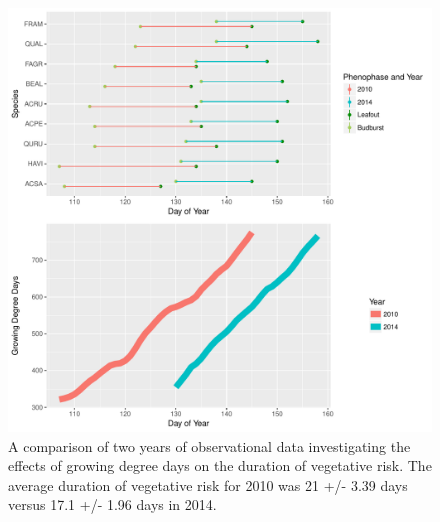 \documentclass{article}\usepackage[]{graphicx}\usepackage[]{color}
\begin{document}
\begin{figure} [H] 
\begin{center}
\includegraphics{..//figure/HF_gddTime.pdf}
\caption{A comparison of two years of observational data investigating the effects of growing degree days on the duration of vegetative risk. The average duration of vegetative risk for 2010 was 21 +/- 3.39 days versus 17.1 +/- 1.96 days in 2014.}\label{fig:forest}
\end{center}
\end{figure}



\end{document}
